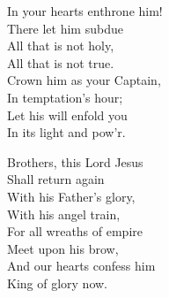 \documentclass{beamer}
\begin{document}
{\begin{frame}{}
\end{frame}

\hypertarget{At the name of Jesus[]3}{}
\begin{frame}{}
\fontsize{ 18 }{ 23 }\selectfont

In your hearts enthrone him!\\ 
There let him subdue\\ 
All that is not holy,\\ 
All that is not true.\\ 
Crown him as your Captain,\\ 
In temptation's hour;\\ 
Let his will enfold you\\ 
In its light and pow'r. 

\end{frame}

\hypertarget{At the name of Jesus[]4}{}
\begin{frame}{}
\fontsize{ 18 }{ 23 }\selectfont

Brothers, this Lord Jesus\\ 
Shall return again\\ 
With his Father's glory,\\ 
With his angel train,\\ 
For all wreaths of empire\\ 
Meet upon his brow,\\ 
And our hearts confess him\\ 
King of glory now. 

\end{frame}

}
 
\end{document}
